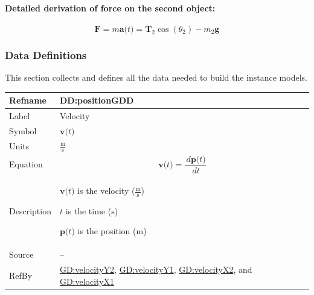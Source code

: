 \documentclass[12pt]{article}
\begin{document}
\paragraph{Detailed derivation of force on the second object:}
\label{GD:yForce2Deriv}
\begin{displaymath}
\symbf{F}=m \symbf{a}\text{(}t\text{)}={\symbf{T}_{2}} \cos\left({θ_{2}}\right)-{m_{2}} \symbf{g}
\end{displaymath}
\subsubsection{Data Definitions}
\label{Sec:DDs}
This section collects and defines all the data needed to build the instance models.

\vspace{\baselineskip}
\noindent
\begin{minipage}{\textwidth}
\begin{tabular}{>{\raggedright}p{}>{\raggedright\arraybackslash}p{}}
\toprule \textbf{Refname} & \textbf{DD:positionGDD}
\label{DD:positionGDD}
\\ \midrule
Label & Velocity
        
\\ \midrule
Symbol & $\symbf{v}\text{(}t\text{)}$
         
\\ \midrule
Units & $\frac{\text{m}}{\text{s}}$
        
\\ \midrule
Equation & \begin{displaymath}
           \symbf{v}\text{(}t\text{)}=\frac{\,d\symbf{p}\text{(}t\text{)}}{\,dt}
           \end{displaymath}
\\ \midrule
Description & \begin{symbDescription}
              \item{$\symbf{v}\text{(}t\text{)}$ is the velocity ($\frac{\text{m}}{\text{s}}$)}
              \item{$t$ is the time (${\text{s}}$)}
              \item{$\symbf{p}\text{(}t\text{)}$ is the position (${\text{m}}$)}
              \end{symbDescription}
\\ \midrule
Source & --
         
\\ \midrule
RefBy & \hyperref[GD:velocityY2]{GD:velocityY2}, \hyperref[GD:velocityY1]{GD:velocityY1}, \hyperref[GD:velocityX2]{GD:velocityX2}, and \hyperref[GD:velocityX1]{GD:velocityX1}
        
\\ \bottomrule
\end{tabular}
\end{minipage}
\end{document}
